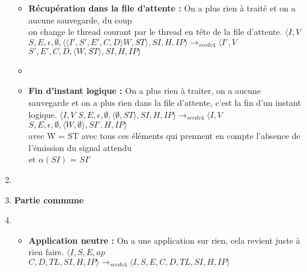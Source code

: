 \documentclass[10pt,a4paper]{article}
\begin{document}
\begin{enumerate}
\begin{itemize}
						\item[] \textbf{Récupération dans la file d'attente :} On a plus rien à traité et on a aucune sauvegarde, du coup 
						\\on change le thread courant par le thread en tête de la file d'attente.
						\smallbreak
						$\langle I,V$ $S,E,\epsilon,\emptyset,\langle\langle I',S',E',C,D\rangle W,ST\rangle,SI,H,IP\rangle 
						\longrightarrow_{secdv4} \langle I',V$ $S',E',C,D,\langle W,ST\rangle,SI,H,IP\rangle$
						\item[]
						
						\item[] \textbf{Fin d'instant logique :} On a plus rien à traiter, on a aucune sauvegarde et on a plus rien dans la file d'attente, c'est la fin d'un instant logique.
						\smallbreak
						$\langle I,V$ $S,E,\epsilon,\emptyset,\langle\emptyset,ST\rangle,SI,H,IP\rangle 
						\longrightarrow_{secdv4} \langle I,V$ $S,E,\epsilon,\emptyset,\langle W,\emptyset\rangle,SI',H,IP\rangle$\\
						avec W = ST avec tous ces éléments qui prennent en compte l'absence de l'émission du signal attendu
						\\et  $\alpha(SI)$ = $SI'$ 
					\end{itemize}
					\item[]
					\item[] \textbf{Partie commune} 
					\item[]
					\begin{itemize}
						\item[] \textbf{Application neutre :} On a une application sur rien, cela revient juste à rien faire.
						\smallbreak 
						$\langle I,S,E,ap$ $C,D,TL,SI,H,IP\rangle
						\longrightarrow_{secdv4} \langle I,S,E,C,D,TL,SI,H,IP\rangle$
					\end{itemize}
				\end{enumerate}
				\bigbreak
				\bigbreak
					
			
			
\end{document}
